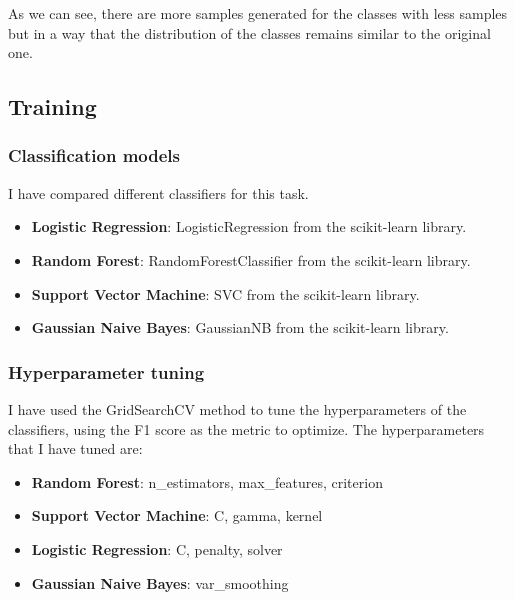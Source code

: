 As we can see, there are more samples generated for the classes with less samples but in a way that the distribution of the classes remains similar to the original one.

\subsection{Training} \label{sec:training}

\subsubsection{Classification models} \label{sec:training-classifier-selection}
I have compared different classifiers for this task.
\begin{itemize}
    \item \textbf{Logistic Regression}: LogisticRegression from the scikit-learn library.
    \item \textbf{Random Forest}: RandomForestClassifier from the scikit-learn library.
    \item \textbf{Support Vector Machine}: SVC from the scikit-learn library.
    \item \textbf{Gaussian Naive Bayes}: GaussianNB from the scikit-learn library.
\end{itemize}


\subsubsection{Hyperparameter tuning} \label{sec:training-hyperparameter-tuning}
I have used the GridSearchCV method to tune the hyperparameters of the classifiers, using the F1 score as the metric to optimize.
The hyperparameters that I have tuned are:
\begin{itemize}
    \item \textbf{Random Forest}: n\_estimators, max\_features, criterion
    \item \textbf{Support Vector Machine}: C, gamma, kernel
    \item \textbf{Logistic Regression}: C, penalty, solver
    \item \textbf{Gaussian Naive Bayes}: var\_smoothing
\end{itemize}

